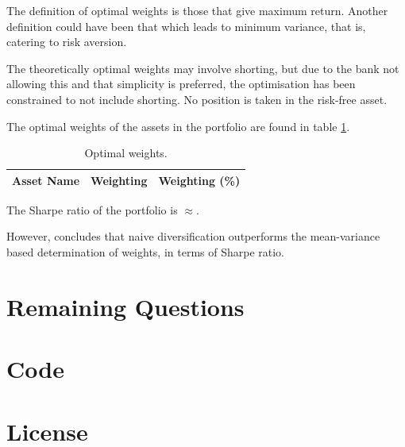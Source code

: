 \documentclass[a4paper]{article}
\begin{document}
The definition of optimal weights is those that give maximum return. Another definition could have been that which leads to minimum variance, that is, catering to risk aversion.

The theoretically optimal weights may involve shorting, but due to the bank not allowing this and that simplicity is preferred, the optimisation has been constrained to not include shorting. No position is taken in the risk-free asset.

The optimal weights of the assets in the portfolio are found in table \ref{table_optimal_weights}.

\begin{table}[H]
    \begin{center}
    \begin{tabular}{ |l|l|l| }
        \hline
        Asset Name & Weighting & Weighting (\%) \\
        \hline

        

        \hline
    \end{tabular}
    \caption{Optimal weights.}
    \label{table_optimal_weights}
    \end{center}
\end{table}

The Sharpe ratio of the portfolio is $\approx$\optSR.

However, \citet{naive_div} concludes that naive diversification outperforms the mean-variance based determination of weights, in terms of Sharpe ratio.

\section{Remaining Questions}

\printbibliography

\appendix

\section{Code}



\section{License}

\doclicenseThis
\end{document}
